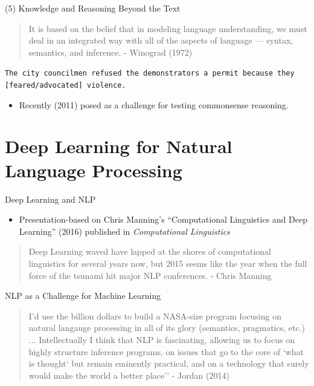 \documentclass{beamer}
\begin{document}
\begin{frame}{(5) Knowledge and Reasoning Beyond the Text}
\begin{quote}
It is based on the belief that in modeling language understanding, we must deal in an integrated way with all of the aspects of language — syntax, semantics, and inference. {- \normalfont Winograd (1972) }  
\end{quote}


\texttt{The city councilmen refused the demonstrators a permit because they [feared/advocated] violence.}


\begin{itemize}
\item Recently (2011) posed as a challenge for testing commonsense reasoning.  

\end{itemize}
\end{frame}


\section{Deep Learning for Natural Language Processing}

\begin{frame}{Deep Learning and NLP}
  \begin{itemize}
  \item Presentation-based on Chris Manning's ``Computational Linguistics and Deep Learning'' (2016) published in \textit{Computational Linguistics} 
  \end{itemize}

  \begin{quote}
    Deep Learning waved have lapped at the shores of computational linguistics for several years now, but 2015 seems like the year when the full force of the tsunami hit major NLP conferences. {\normalfont - Chris Manning}
  \end{quote}

\end{frame}

\begin{frame}{NLP as a Challenge for Machine Learning}

  \begin{quote}
    I'd use the billion dollars to build a NASA-size program focusing
    on natural langauge processing in all of its glory (semantics,
    pragmatics, etc.) ... Intellectually I think that NLP is
    fascinating, allowing us to focus on highly structure inference
    programs, on issues that go to the core of `what is thought` but
    remain eminently practical, and on a technology that surely would
    make the world a better place'' {\normalfont - Jordan
      (2014)}
  \end{quote}
\end{frame}
\end{document}
